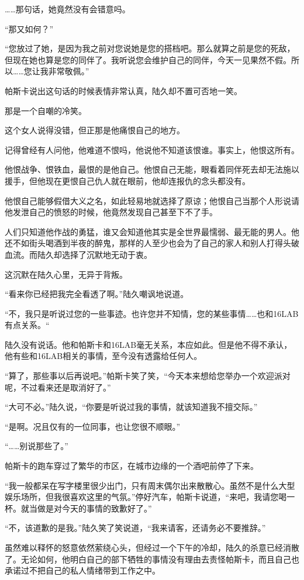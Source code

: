 ……那句话，她竟然没有会错意吗。

“那又如何？”

“您放过了她，是因为我之前对您说她是您的搭档吧。那么就算之前是您的死敌，但现在她也算是您的同伴了。我听说您会维护自己的同伴，今天一见果然不假。所以……您让我非常敬佩。”

帕斯卡说出这句话的时候表情非常认真，陆久却不置可否地一笑。

那是一个自嘲的冷笑。

这个女人说得没错，但正那是他痛恨自己的地方。

记得曾经有人问他，他难道不恨吗，他说他不知道该恨谁。事实上，他恨这所有。

他恨战争、恨铁血，最恨的是他自己。他恨自己无能，眼看着同伴死去却无法施以援手，但他现在更恨自己仇人就在眼前，他却连报仇的念头都没有。

他恨自己能够假借大义之名，如此轻易地就选择了原谅；他恨自己当那个人形说请他发泄自己的愤怒的时候，他竟然发现自己甚至下不了手。

人们只知道他作战的勇猛，谁又会知道他其实是全世界最懦弱、最无能的男人。他还不如街头喝酒到半夜的醉鬼，那样的人至少也会为了自己的家人和别人打得头破血流。而陆久却选择了沉默地无动于衷。

这沉默在陆久心里，无异于背叛。

“看来你已经把我完全看透了啊。”陆久嘲讽地说道。

“不，我只是听说过您的一些事迹。也许您并不知情，您的某些事情……也和16LAB有点关系。“

陆久没有说话。他和帕斯卡和16LAB毫无关系，本应如此。但是他不得不承认，他有些和16LAB相关的事情，至今没有透露给任何人。

“算了，那些事以后再说吧。”帕斯卡笑了笑，“今天本来想给您举办一个欢迎派对呢，不过看来还是取消好了。”

“大可不必。”陆久说，“你要是听说过我的事情，就该知道我不擅交际。”

“是啊。况且仅有的一位同事，也让您很不顺眼。”

“……别说那些了。”

帕斯卡的跑车穿过了繁华的市区，在城市边缘的一个酒吧前停了下来。

“我一般都呆在写字楼里很少出门，只有周末偶尔出来散散心。虽然不是什么大型娱乐场所，但我很喜欢这里的气氛。”停好汽车，帕斯卡说道，“来吧，我请您喝一杯。就当做是对今天的事情的致歉好了。”

“不，该道歉的是我。”陆久笑了笑说道，“我来请客，还请务必不要推辞。”

虽然难以释怀的怒意依然萦绕心头，但经过一个下午的冷却，陆久的杀意已经消散了。无论如何，他明白自己的部下牺牲的事情没有理由去责怪帕斯卡，而且自己也承诺过不把自己的私人情绪带到工作之中。

